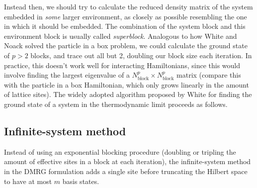 Instead then, we should try to calculate the reduced density matrix of the
system embedded in \textit{some} larger environment, as closely as possible
resembling the one in which it should be embedded.  The combination of the
system block and this environment block is usually called \textit{superblock}.
Analogous to how White and Noack solved the particle in a box problem, we could
calculate the ground state of $p > 2$ blocks,
and trace out all but 2, doubling our block size each iteration. In
practice, this doesn't work well for interacting Hamiltonians, since this
would involve finding the largest eigenvalue of a $N_{\text{block}}^p
\times N_{\text{block}}^p$ matrix (compare this with the particle in a box
Hamiltonian, which only grows linearly in the amount of lattice sites).
The widely adopted algorithm proposed by White \cite{white1993density} for
finding the ground state of a system in the thermodynamic limit proceeds
as follows.


\subsection{Infinite-system method}

 
Instead of using an exponential blocking procedure (doubling or tripling the
amount of effective sites in a block at each iteration), the infinite-system
method in the DMRG formulation adds a single site before truncating the Hilbert
space to have at most $m$ basis states.

